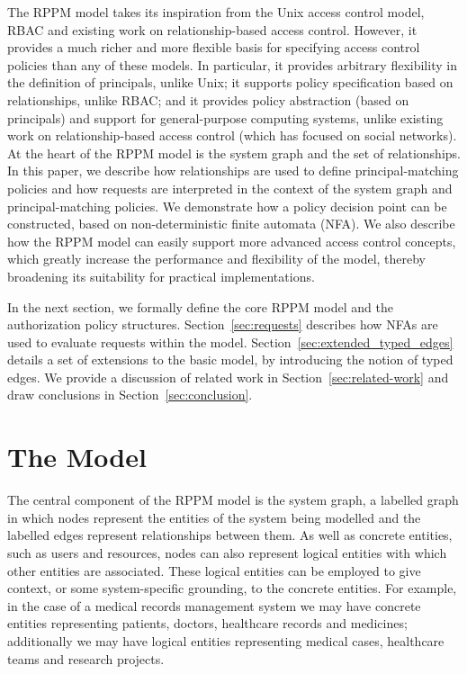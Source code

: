 \documentclass{article}
\begin{document}
The RPPM model takes its inspiration from the Unix access control model, RBAC and existing work on relationship-based access control.
However, it provides a much richer and more flexible basis for specifying access control policies than any of these models.
In particular, it provides arbitrary flexibility in the definition of principals, unlike Unix; it supports policy specification based on relationships, unlike RBAC; and it provides policy abstraction (based on principals) and support for general-purpose computing systems, unlike existing work on relationship-based access control (which has focused on social networks).
At the heart of the RPPM model is the system graph and the set of relationships.
In this paper, we describe how relationships are used to define principal-matching policies and how requests are interpreted in the context of the system graph and principal-matching policies.
We demonstrate how a policy decision point can be constructed, based on non-deterministic finite automata (NFA).
We also describe how the RPPM model can easily support more advanced access control concepts, which greatly increase the performance and flexibility of the model, thereby broadening its suitability for practical implementations.

In the next section, we formally define the core RPPM model and the authorization policy structures.
Section~\ref{sec:requests} describes how NFAs are used to evaluate requests within the model.
Section~\ref{sec:extended_typed_edges} details a set of extensions to the basic model, by introducing the notion of typed edges.
We provide a discussion of related work in Section~\ref{sec:related-work} and draw conclusions in Section~\ref{sec:conclusion}.

\section{The Model}\label{sec:model}
The central component of the RPPM model is the system graph, a labelled graph in which nodes represent the entities of the system being modelled and the labelled edges represent relationships between them.
As well as concrete entities, such as users and resources, nodes can also represent logical entities with which other entities are associated.
These logical entities can be employed to give context, or some system-specific grounding, to the concrete entities.
For example, in the case of a medical records management system we may have concrete entities representing patients, doctors, healthcare records and medicines; additionally we may have logical entities representing medical cases, healthcare teams and research projects.
\end{document}
